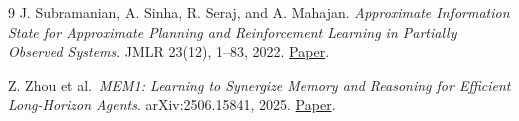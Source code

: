 \documentclass[11pt,letterpaper]{article}
\begin{document}
\begin{thebibliography}{9}
\setlength{\itemsep}{1pt}
J. Subramanian, A. Sinha, R. Seraj, and A. Mahajan.
\emph{Approximate Information State for Approximate Planning and Reinforcement
Learning in Partially Observed Systems}. JMLR 23(12), 1--83, 2022.
\href{https://jmlr.org/papers/v23/20-1165.html}{Paper}.

Z. Zhou et al.\ \emph{MEM1: Learning to Synergize Memory and Reasoning for Efficient
Long-Horizon Agents}. arXiv:2506.15841, 2025.
\href{https://arxiv.org/abs/2506.15841}{Paper}.
\end{thebibliography}
\end{document}
